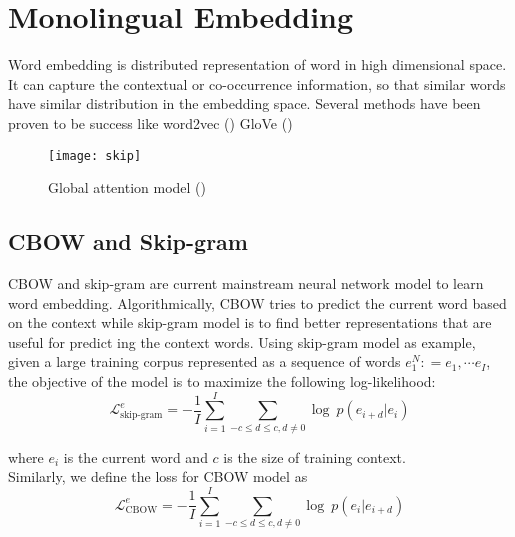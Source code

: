 \section{Monolingual Embedding}
Word embedding is distributed representation of word in high dimensional space. It can capture the contextual or co-occurrence information, so that similar words have similar distribution in the embedding space.  Several methods have been proven to be success like word2vec (\cite{mikolov2013efficient}) GloVe (\cite{pennington2014glove})
\begin{figure}[h]
	\texttt{[image: skip]}
	\caption{Global attention model (\cite{mikolov2013efficient})}
	\centering
\end{figure}
\subsection{CBOW and Skip-gram}
CBOW and skip-gram are current mainstream neural network model to learn word embedding. Algorithmically,  CBOW tries to predict the current word based on the context while skip-gram model is to find better representations that are useful for predict \cite{qi2018and}ing the context words. Using skip-gram model as example, given a large training corpus represented as a sequence of words ${e_1^N: = e_1, \cdots e_I}$, the objective of the model is to maximize the following log-likelihood:
\[ \mathcal{L}^e_{\text{skip-gram}} = - \frac{1}{I} \sum_{i=1}^{I} \sum_{ -c \le d \le c, d\ne 0} \log\ {p(e_{i+d}|e_i)}\]

where $e_i$ is the current word and $c$ is the size of training context. \\


Similarly, we define the loss for CBOW model as
\[ \mathcal{L}^e_{\text{CBOW}} = - \frac{1}{I} \sum_{i=1}^{I} \sum_{ -c \le d \le c, d\ne 0} \log\ {p(e_{i}|e_{i+d})}\]

